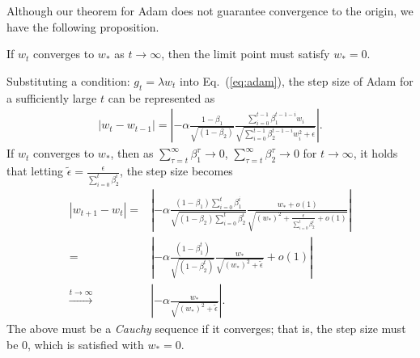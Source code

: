 \documentclass[conference]{IEEEtran}
\begin{document}
Although our theorem for Adam does not guarantee convergence to the origin, we have the following proposition.
\begin{prop}
If $w_t$ converges to $w_{*}$ as $t \to \infty$,
then the limit point must satisfy $w_{*} = 0$.  \\
\end{prop}
\noindent Substituting a condition: $g_t = \lambda w_t$ into Eq.~(\ref{eq:adam}), the step size of Adam for a sufficiently large $t$ can be represented as \\
\begin{align*}
|w_t - w_{t-1}| = \left|- \alpha \frac{1 - \beta_1}{\sqrt{\left( 1 - \beta_2 \right)}} \frac{\sum_{i=0}^{t-1}\beta_1^{t-1-i}w_i}{\sqrt{\sum_{i=0}^{t-1}\beta_2^{t-1-i}w_i^2 + \epsilon}} \right|.
\end{align*}
If $w_t$ converges to $w_{*}$, 
then as $\sum_{\tau=t}^\infty \beta_1^\tau \to 0$, 
$\sum_{\tau=t}^\infty \beta_2^\tau \to 0$ for $t\to \infty$,
it holds that 
letting $\tilde{\epsilon} = \frac{\epsilon}{\sum_{i=0}^t \beta_2^{i}}$, the step size becomes
\footnotesize
\begin{align*}
|w_{t+1} - w_{t}| 
= &  \left|- \alpha \frac{\left(1 - \beta_1 \right)\sum_{i=0}^t
\beta_1^{i}}{\sqrt{\left( 1 - \beta_2 \right)\sum_{i=0}^t\beta_2^{i}}} \frac{w_{*} + o(1)}{\sqrt{\left(w_{*} \right)^2 + \frac{\epsilon}{\sum_{i=0}^t \beta_2^{i}}+ o(1)}} \right| \\
= &  \left|- \alpha \frac{\left(1 - \beta_1^t \right)}{\sqrt{\left( 1 - \beta_2^t \right)}} \frac{w_{*}}{\sqrt{\left(w_{*} \right)^2 + \tilde{\epsilon}}} 
+ o(1)
\right| \\
\stackrel{t \to \infty}{\longrightarrow}  & \left|- \alpha \frac{w_{*}}{\sqrt{\left(w_{*} \right)^2 + \tilde{\epsilon}}
} \right|.
\end{align*}
\normalsize
The above must be a \textit{Cauchy} sequence if it converges; that is, the step size must be 0, which is satisfied with $w_*=0$. \\
\end{document}
